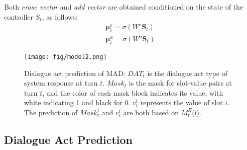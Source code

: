 Both {\it erase vector} and {\it add vector} are obtained conditioned on the state of the controller $S_t$, as follows:
\begin{gather}
    \bm{\mu}_t^e=\sigma(W^e\bm{S}_t)\\
    \bm{\mu}_t^a=\sigma(W^a\bm{S}_t)
\end{gather}


\begin{figure}
  \texttt{[image: fig/model2.png]}
  \caption{Dialogue act prediction of MAD: ${DAT}_t$ is the dialogue act type of system response at turn $t$. ${Mask}_t$ is the mask for slot-value pairs at turn $t$, and the color of each mask block indicates its value, with white indicating 1 and black for 0. $v_t^i$ represents the value of slot $i$. The prediction of ${Mask}_t^i$ and $v_t^i$ are both based on $M_t^E$(i).
  }%
  \label{fig:model2}
\end{figure}


\subsection{Dialogue Act Prediction}
\label{sec:prediction}

